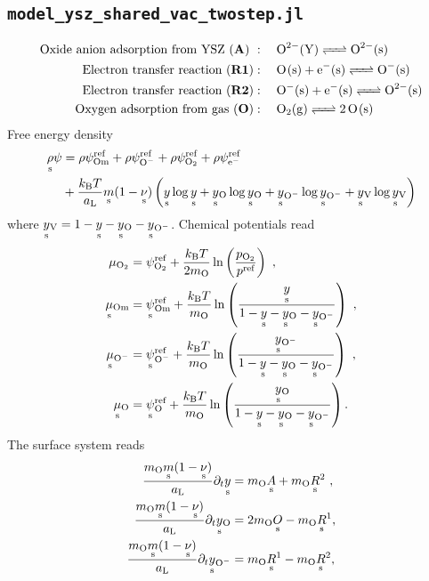 \documentclass{article}
\numberwithin{equation}{section}
\newcommand{\us}[1]{\underset{\textrm{s}}{#1}{}}
\def\kB{k_\mathrm{B}}
\def\Ox{\mathrm{O}}
\newcommand{\Omin}{{\ce{O-}}}
\def\Om{\mathrm{Om}}
\newcommand{\OO}{{\ce{O2}}}
\def\eM{\mathrm{e^-}}
\def\aL{a_\mathrm{L}}
\def\ys{\us y}
\newcommand{\ysV}{\us y_{\textrm{V}}}
\newcommand{\yOmin}{\us y_{\ce{O-}}}
\def\yOs{\us y_\textrm{O}}
\def\REF{\textrm{ref}}
\begin{document}
\subsection{\texttt{model\_ysz\_shared\_vac\_twostep.jl}}
\begin{subequations}
\begin{align}
\text{Oxide anion adsorption from YSZ (\textbf{A})}  \ &: \quad 
\ce{O^{2-}(Y) <=> O^{2-}(s)}
\\
\text{Electron transfer reaction (\textbf{R1})}   &: \quad 
\ce{O(s) +  e^-(s) <=> O^{-}(s)}
\\
\text{Electron transfer reaction (\textbf{R2})}  &: \quad 
\ce{O^-(s) +  e^-(s) <=> O^{2-}(s)}
\\
\text{Oxygen adsorption from gas (\textbf{O})}   &: \quad 
\ce{O2(g) <=> 2O(s)}
\end{align}
\end{subequations}
Free energy density
\begin{align}
    \us\rho\psi &= 
              \rho\psi^\REF_\Om
            + \rho\psi^\REF_\Omin
            + \rho\psi^\REF_\OO
            + \rho\psi^\REF_\eM\nonumber
            \\
            &+ \frac{\kB T}{\aL}\us m(1-\us\nu) 
            \left( 
                \ys   \log {\ys} 
                +\yOs  \log {\yOs}
                +\yOmin  \log {\yOmin}
                +\ysV  \log {\ysV}
            \right)
    \label{}
\end{align}
where $\ysV = 1 - \ys - \yOs - \yOmin$.
Chemical potentials read
\begin{subequations}
\begin{align}
\mu_{\OO} &= \psi_{\OO}^\REF + \frac{\kB T}{2 m_\Ox}\ln 
\left( 
    \frac{p_\OO}{p^\REF} 
\right)~,
\\
\us\mu_{\Om} 
&= 
\us \psi_{\Om}^\REF 
+ 
\frac{\kB T}{m_\Ox} \ln 
\left(  
	\frac{\ys}{1-\ys - \yOs- \yOmin}
\right)~,
\\
\us\mu_{\Omin} 
&= 
\us \psi_{\Omin}^\REF 
+ 
\frac{\kB T}{m_\Ox} \ln 
\left(  
	\frac{\yOmin}{1-\ys - \yOs - \yOmin}
\right)~,
\\
\us\mu_{\Ox} 
&= 
\us \psi_{\Ox}^\REF 
+ 
\frac{\kB T}{m_\Ox} \ln 
\left(  
	\frac{\yOs}{1-\ys - \yOs- \yOmin}
\right).
\end{align}
\end{subequations}
The surface system reads
\begin{subequations}
\begin{align}
 \frac{m_\Ox \us m (1- \us \nu)}{\aL}\partial_t \ys
&=
m_\Ox \us A
+
m_\Ox \us R^2~,
\\
 \frac{m_\Ox \us m (1- \us \nu)}{\aL}\partial_t \yOs
&=
2 m_\Ox \us O
-
m_\Ox \us R^1,
\\
\frac{m_\Ox \us m (1- \us \nu)}{\aL}\partial_t \yOmin
&=
m_\Ox \us R^1
-
m_\Ox \us R^2,
\end{align}
\end{subequations}
\end{document}
